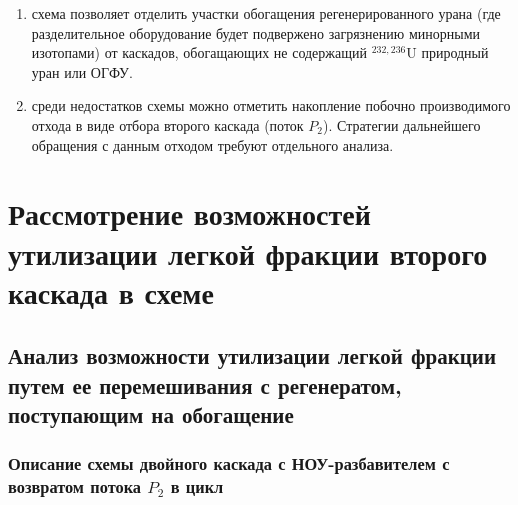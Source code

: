 {\begin{enumerate}
\begin{itemize}
    \item наиболее обоснованным критерием эффективности является величина затрат работы разделения. С другой стороны наилучший набор параметров схемы может зависеть от исходного состава обогащаемого регенерата, поэтому целесообразно для определения оптимальных условий обогащения того или иного состава регенерата осуществлять расчёт и оптимизацию параметров каскадной схемы с использованием всех рассмотренных критериев эффективности.
    \item эффективность предложенной каскадной схемы зависит от выбранного диапазона изменения концентрации $^{235}$U в потоке отбора каскада II -- $P_2$. Наилучшие наборы параметров каскадной схемы для каждого из критериев лежат в области, где $C_{235,{P_2}} > 20\%$. Это означает, что при практической реализации модифицированного двойного каскада целесообразно рассматривать возможность получения в отдельных потоках такой схемы концентраций $^{235}$U, превышающих 20\%, и, в первую очередь, в потоке $P_2$.
    \end{itemize}       
    \item схема позволяет отделить участки обогащения регенерированного урана (где разделительное оборудование будет подвержено загрязнению минорными изотопами) от каскадов, обогащающих не содержащий $^{232,236}$U природный уран или ОГФУ. 
     \item среди недостатков схемы можно отметить накопление побочно производимого отхода в виде отбора второго каскада (поток $P_2$). Стратегии дальнейшего обращения с данным отходом требуют отдельного анализа.

\end{enumerate}


\section{Рассмотрение возможностей утилизации легкой фракции второго каскада в схеме}

\subsection{Анализ возможности утилизации легкой фракции путем ее перемешивания с регенератом, поступающим на обогащение}

\subsubsection{Описание схемы двойного каскада с НОУ-разбавителем с возвратом потока $P_2$ в цикл}\label{P2ret}

}
